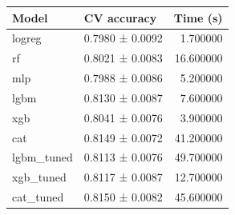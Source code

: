 \begin{tabular}{llr}
\toprule
Model & CV accuracy & Time (s) \\
\midrule
logreg & 0.7980 ± 0.0092 & 1.700000 \\
rf & 0.8021 ± 0.0083 & 16.600000 \\
mlp & 0.7988 ± 0.0086 & 5.200000 \\
lgbm & 0.8130 ± 0.0087 & 7.600000 \\
xgb & 0.8041 ± 0.0076 & 3.900000 \\
cat & 0.8149 ± 0.0072 & 41.200000 \\
lgbm_tuned & 0.8113 ± 0.0076 & 49.700000 \\
xgb_tuned & 0.8117 ± 0.0087 & 12.700000 \\
cat_tuned & 0.8150 ± 0.0082 & 45.600000 \\
\bottomrule
\end{tabular}
